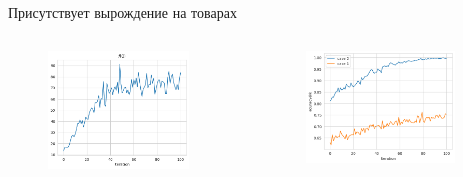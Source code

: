 \documentclass{beamer}
\begin{document}
\begin{frame}
    Присутствует вырождение на товарах
    \begin{columns}[c]
    
        \begin{figure}
            \centering
            \includegraphics[width=0.9\textwidth]{images/f0.png}
        \end{figure}

        \begin{figure}
            \centering
            \includegraphics[width=0.9\textwidth]{images/accuracyk.png}
        \end{figure}

    \end{columns}


\end{frame}
\end{document}
